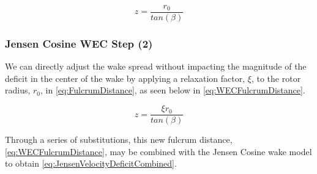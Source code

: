 \documentclass[a4paper]{jpconf}
\begin{document}
\begin{equation}
z = \frac{r_0}{tan(\beta)}
\label{eq:FulcrumDistance}
\end{equation} 


\subsubsection{Jensen Cosine WEC Step (2)}
We can directly adjust the wake spread without impacting the magnitude of the deficit in the center of the wake by applying a relaxation factor, $\xi$, to the rotor radius, $r_0$, in \cref{eq:FulcrumDistance}, as seen below in \cref{eq:WECFulcrumDistance}.
%

%


\begin{equation}
z = \frac{\xi r_0}{tan(\beta)}
\label{eq:WECFulcrumDistance}
\end{equation}

Through a series of substitutions, this new fulcrum distance, \cref{eq:WECFulcrumDistance}, may be combined with the Jensen Cosine wake model to obtain \cref{eq:JensenVelocityDeficitCombined}.




\end{document}

